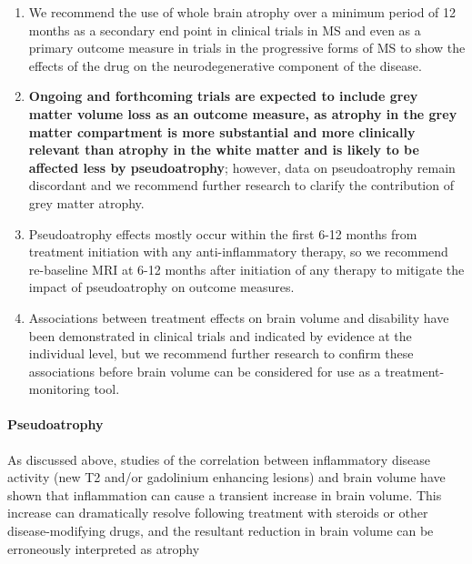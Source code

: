 \documentclass[final, paper=letter,5p,times,twocolumn]{elsarticle}
\theoremstyle{definition}
\begin{document}
\begin{enumerate}
\item We recommend the use of whole brain atrophy over a minimum period of 12 months as a secondary end point in clinical trials in MS and even as a primary outcome measure in trials in the progressive forms of MS to show the effects of the drug on the neurodegenerative component of the disease.
\item {\bf Ongoing and forthcoming trials are expected to include grey matter volume loss as an outcome measure, as atrophy in the grey matter compartment is more substantial and more clinically relevant than atrophy in the white matter and is likely to be affected less by pseudoatrophy}; however, data on pseudoatrophy remain discordant and we recommend further research to clarify the contribution of grey matter atrophy.
\item Pseudoatrophy effects mostly occur within the first 6-12 months from treatment initiation with any anti-inflammatory therapy, so we recommend re-baseline MRI at 6-12 months after initiation of any therapy to mitigate the impact of pseudoatrophy on outcome measures.
\item Associations between treatment effects on brain volume and disability have been demonstrated in clinical trials and indicated by evidence at the individual level, but we recommend further research to confirm these associations before brain volume can be considered for use as a treatment-monitoring tool.
\end{enumerate}

\paragraph{Pseudoatrophy}{As discussed above, studies of the correlation between inflammatory disease activity (new T2 and/or gadolinium enhancing lesions) and brain volume have shown that inflammation can cause a transient increase in brain volume. This increase can dramatically resolve following treatment with steroids or other disease-modifying drugs, and the resultant reduction in brain volume can be erroneously interpreted as atrophy}
\end{document}
